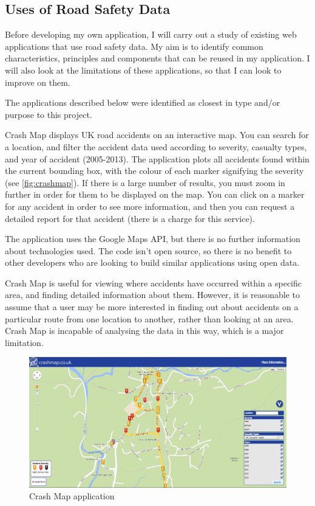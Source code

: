 \documentclass[authoryearcitations]{UoYCSproject}
\begin{document}
\subsection{Uses of Road Safety Data}

Before developing my own application, I will carry out a study of existing web applications that use road safety data. My aim is to identify common characteristics, principles and components that can be reused in my application. I will also look at the limitations of these applications, so that I can look to improve on them.

The applications described below were identified as closest in type and/or purpose to this project.
 
Crash Map \citep{crashmap} displays UK road accidents on an interactive map. You can search for a location, and filter the accident data used according to severity, casualty types, and year of accident (2005-2013). The application plots all accidents found within the current bounding box, with the colour of each marker signifying the severity (see \autoref{fig:crashmap}). If there is a large number of results, you must zoom in further in order for them to be displayed on the map. You can click on a marker for any accident in order to see more information, and then you can request a detailed report for that accident (there is a charge for this service).

The application uses the Google Maps API, but there is no further information about technologies used. The code isn't open source, so there is no benefit to other developers who are looking to build similar applications using open data. 

Crash Map is useful for viewing where accidents have occurred within a specific area, and finding detailed information about them. However, it is reasonable to assume that a user may be more interested in finding out about accidents on a particular route from one location to another, rather than looking at an area. Crash Map is incapable of analysing the data in this way, which is a major limitation.

\begin{figure}
	\includegraphics[scale=0.3]{crashmap}
	\caption{Crash Map application}
	\label{fig:crashmap}
\end{figure}
\end{document}

